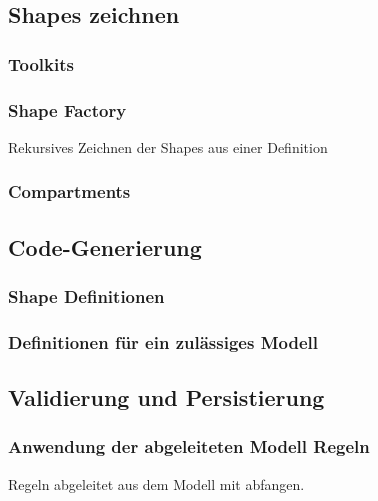 \subsection{Shapes zeichnen}

\subsubsection{Toolkits}

\subsubsection{\dd}

\citep{dd}

\subsubsection{Shape Factory}

Rekursives Zeichnen der Shapes aus einer Definition

\subsubsection{Compartments}


\subsection{Code-Generierung}

\subsubsection{Shape Definitionen}

\subsubsection{Definitionen für ein zulässiges Modell}


\subsection{Validierung und Persistierung}

\subsubsection{Anwendung der abgeleiteten Modell Regeln}

Regeln abgeleitet aus dem Modell mit \dd abfangen.

